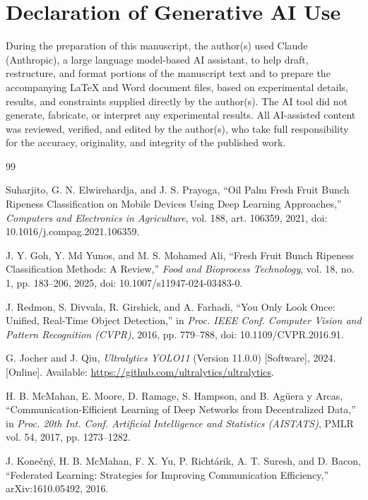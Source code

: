 \documentclass[11pt]{article}
\begin{document}
\section*{Declaration of Generative AI Use}
During the preparation of this manuscript, the author(s) used Claude (Anthropic), a large language model-based AI assistant, to help draft, restructure, and format portions of the manuscript text and to prepare the accompanying LaTeX and Word document files, based on experimental details, results, and constraints supplied directly by the author(s). The AI tool did not generate, fabricate, or interpret any experimental results. All AI-assisted content was reviewed, verified, and edited by the author(s), who take full responsibility for the accuracy, originality, and integrity of the published work.

\begin{thebibliography}{99}

 Suharjito, G. N. Elwirehardja, and J. S. Prayoga, ``Oil Palm Fresh Fruit Bunch Ripeness Classification on Mobile Devices Using Deep Learning Approaches,'' \emph{Computers and Electronics in Agriculture}, vol. 188, art. 106359, 2021, doi: 10.1016/j.compag.2021.106359.

 J. Y. Goh, Y. Md Yunos, and M. S. Mohamed Ali, ``Fresh Fruit Bunch Ripeness Classification Methods: A Review,'' \emph{Food and Bioprocess Technology}, vol. 18, no. 1, pp. 183--206, 2025, doi: 10.1007/s11947-024-03483-0.

 J. Redmon, S. Divvala, R. Girshick, and A. Farhadi, ``You Only Look Once: Unified, Real-Time Object Detection,'' in \emph{Proc. IEEE Conf. Computer Vision and Pattern Recognition (CVPR)}, 2016, pp. 779--788, doi: 10.1109/CVPR.2016.91.

 G. Jocher and J. Qiu, \emph{Ultralytics YOLO11} (Version 11.0.0) [Software], 2024. [Online]. Available: \url{https://github.com/ultralytics/ultralytics}.

 H. B. McMahan, E. Moore, D. Ramage, S. Hampson, and B. Ag\"uera y Arcas, ``Communication-Efficient Learning of Deep Networks from Decentralized Data,'' in \emph{Proc. 20th Int. Conf. Artificial Intelligence and Statistics (AISTATS)}, PMLR vol. 54, 2017, pp. 1273--1282.

 J. Kone\v{c}n\'y, H. B. McMahan, F. X. Yu, P. Richt\'arik, A. T. Suresh, and D. Bacon, ``Federated Learning: Strategies for Improving Communication Efficiency,'' arXiv:1610.05492, 2016.


\end{thebibliography}
\end{document}
